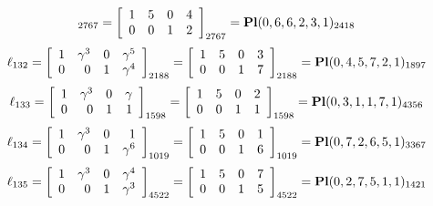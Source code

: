 \documentclass{article}
\begin{document}
{$$_{2767}
=
\left[
\begin{array}{*{4}c}
1  & 5  & 0  & 4\\
0  & 0  & 1  & 2\\
\end{array}
\right]_{2767}
={\rm\bf Pl}(0,6,6,2,3,1 )_{2418}$$
$$
\ell_{132} = 
\left[
\begin{array}{*{4}{r}}
1 & \gamma^{3} & 0 & \gamma^{5}\\
0 & 0 & 1 & \gamma^{4}\\
\end{array}
\right]
_{2188}
=
\left[
\begin{array}{*{4}c}
1  & 5  & 0  & 3\\
0  & 0  & 1  & 7\\
\end{array}
\right]_{2188}
={\rm\bf Pl}(0,4,5,7,2,1 )_{1897}$$
$$
\ell_{133} = 
\left[
\begin{array}{*{4}{r}}
1 & \gamma^{3} & 0 & \gamma \\
0 & 0 & 1 & 1\\
\end{array}
\right]
_{1598}
=
\left[
\begin{array}{*{4}c}
1  & 5  & 0  & 2\\
0  & 0  & 1  & 1\\
\end{array}
\right]_{1598}
={\rm\bf Pl}(0,3,1,1,7,1 )_{4356}$$
$$
\ell_{134} = 
\left[
\begin{array}{*{4}{r}}
1 & \gamma^{3} & 0 & 1\\
0 & 0 & 1 & \gamma^{6}\\
\end{array}
\right]
_{1019}
=
\left[
\begin{array}{*{4}c}
1  & 5  & 0  & 1\\
0  & 0  & 1  & 6\\
\end{array}
\right]_{1019}
={\rm\bf Pl}(0,7,2,6,5,1 )_{3367}$$
$$
\ell_{135} = 
\left[
\begin{array}{*{4}{r}}
1 & \gamma^{3} & 0 & \gamma^{4}\\
0 & 0 & 1 & \gamma^{3}\\
\end{array}
\right]
_{4522}
=
\left[
\begin{array}{*{4}c}
1  & 5  & 0  & 7\\
0  & 0  & 1  & 5\\
\end{array}
\right]_{4522}
={\rm\bf Pl}(0,2,7,5,1,1 )_{1421}$$
}
\end{document}
